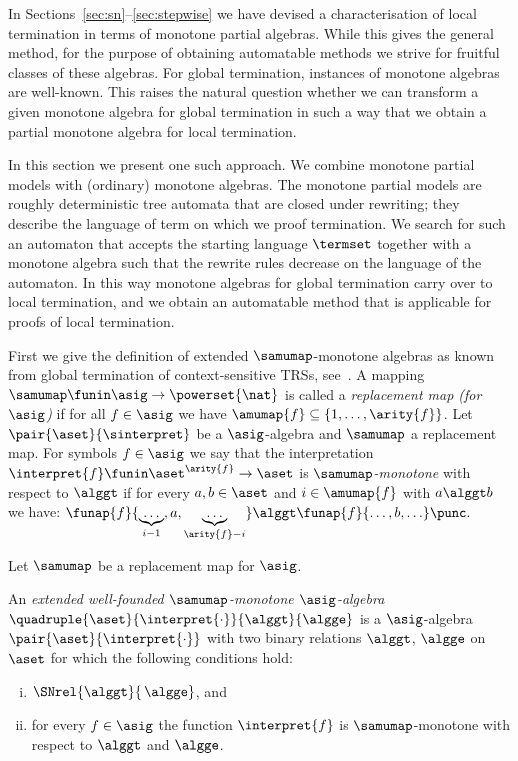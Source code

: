 \noindent In Sections~\ref{sec:sn}--\ref{sec:stepwise} we have devised
a characterisation of local termination in terms of monotone partial
algebras.  While this gives the general method, for the purpose of
obtaining automatable methods we strive for fruitful classes of these
algebras.  For global termination, instances of monotone algebras are
well-known.  This raises the natural question whether we can transform
a given monotone algebra for global termination in such a way that we
obtain a partial monotone algebra for local termination.

In this section we present one such approach.
We combine monotone partial models with (ordinary) monotone algebras.
The monotone partial models are roughly deterministic tree automata
that are closed under rewriting;
they describe the language of term on which we proof termination.
We search for such an automaton that accepts the starting language $\termset$
together with a monotone algebra such that the rewrite rules decrease
on the language of the automaton.
In this way monotone algebras for global termination carry over to local termination,
and we obtain an automatable method that 
is applicable for proofs of local termination.

First we give the definition of extended $\samumap$-monotone algebras as known from 
global termination of context-sensitive TRSs, see~\cite{luca:98,EWZ06}.
A mapping $\samumap \funin \asig \to \powerset{\nat}$
is called a \emph{replacement map (for $\asig$)} if for all $f \in \asig$ we have
$\amumap{f} \subseteq \{1,\ldots,\arity{f}\}$.
Let $\pair{\aset}{\sinterpret}$ be a $\asig$-algebra and $\samumap$ a replacement map.
For symbols $f \in \asig$ we say that the interpretation $\interpret{f} \funin \aset^{\arity{f}} \to \aset$
is \emph{$\samumap$-monotone} with respect to $\alggt$
if for every $a, b \in \aset$ and $i \in \amumap{f}$ with $a \alggt b$ we have:
\(\funap{f}{\underbrace{\ldots}_{i-1},a,\underbrace{\ldots}_{\arity{f}-i}} \alggt \funap{f}{\ldots,b,\ldots}\punc.\)

\begin{definition}\normalfont\label{def:globalalg}
  Let $\samumap$ be a replacement map for $\asig$.


  \noindent An \emph{extended well-founded $\samumap$-monotone $\asig$-algebra 
  $\quadruple{\aset}{\interpret{\cdot}}{{\alggt}}{{\algge}}$}
  is a $\asig$-algebra $\pair{\aset}{\interpret{\cdot}}$
  with two binary relations $\alggt$, $\algge$ on $\aset$ for which
  the following conditions hold:
\begin{enumerate}[(i)]
\item $\SNrel{{\alggt}}{\,{\algge}}$, and
\item for every $f \in \asig$ the function $\interpret{f}$ is $\samumap$-monotone with respect to $\alggt$ and $\algge$.
  \end{enumerate}
\end{definition}


